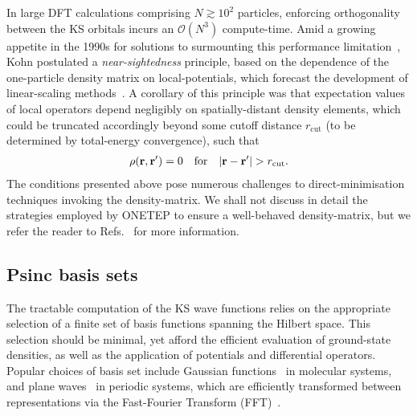 {
In large DFT calculations comprising $N\gtrsim10^2$ particles, 
enforcing orthogonality between the KS orbitals 
incurs an $\mathcal{O}(N^3)$ compute-time.
%
Amid a growing appetite in the 1990s 
for solutions to surmounting 
this performance limitation~\cite{PhysRevLett.66.1438,
doi:10.1063/1.470549,
PhysRevLett.69.3547,
KOHN1993167,
PhysRevB.51.1456,
PhysRevB.47.9973,
PhysRevB.47.10891}, 
Kohn postulated a {\it near-sightedness} principle, 
based on the dependence of 
the one-particle density matrix on local-potentials, 
which forecast the development of 
linear-scaling methods~\cite{PhysRevLett.76.3168}.
%
A corollary of this principle was that 
expectation values 
of local operators depend negligibly  
on spatially-distant density elements, 
which could be truncated accordingly 
beyond some cutoff distance $r_\textrm{cut}$ 
(to be determined by total-energy convergence), 
such that 
%
\begin{align}
\rho(\br,\br')=0
\quad\mbox{for}\quad 
|\br-\br'|> r_\textrm{cut}.
\end{align}}
%
{The conditions presented above 
pose numerous challenges 
to direct-minimisation techniques 
invoking the density-matrix. 
%
We shall not discuss in detail the strategies employed  
by {\sc ONETEP} to ensure a well-behaved  
density-matrix, but we refer the reader 
to Refs.~\cite{RevModPhys.32.335,0953-8984-20-29-294207,PhysRevB.47.10891,PhysRevB.50.17611,PhysRevB.47.10895,PhysRevB.18.7165} 
for more information.}


\subsection{Psinc basis sets}
{
The tractable computation 
of the KS wave functions 
relies on the appropriate 
selection of a finite set of basis functions 
spanning the Hilbert space.
%
This selection should be minimal, 
yet afford the efficient evaluation of 
ground-state densities, 
as well as the application  
of potentials and differential operators.
%
Popular choices of 
basis set 
include Gaussian functions~\cite{WCMS:WCMS1123,doi:10.1063/1.2770708,HAYNES2006345} 
in molecular systems, 
and  plane waves~\cite{0022-3719-12-21-009,0022-3719-18-21-010,KRESSE199615,PhysRevB.54.11169} 
in periodic systems, 
which are efficiently transformed 
between representations via the 
Fast-Fourier Transform (FFT)~\cite{doi:10.1137/1.9781611970999.bm}.}

